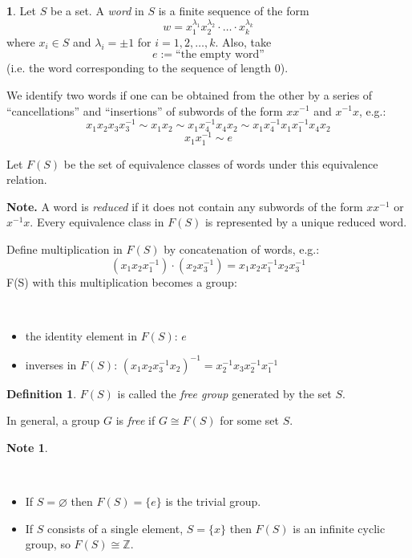 \documentclass[12pt, letterpaper, oneside]{article}
\theoremstyle{plain}
\theoremstyle{definition}
\newtheorem{definition}[theorem]{Definition}
\newtheorem{note}[theorem]{Note}
\newtheorem{nn}[theorem]{}
\newcommand{\Z}{{\mathbb Z}}
\newcommand{\bit}{\begin{itemize}}
\newcommand{\eit}{\end{itemize}}
\newcommand{\vs}{\vskip 5mm}
\begin{document}
\begin{nn}
Let $S$ be a set. A \emph{word} in $S$ is a finite sequence of the form
$$w = x_{1}^{\lambda_{1}}x_{2}^{\lambda_{2}}\cdot \dots\cdot x_{k}^{\lambda_{k}}$$
where $x_{i}\in S$ and $\lambda_{i}= \pm 1$ for $i=1, 2, \dots, k$. Also, take
$$e := \text{``the empty word''}$$
(i.e. the word corresponding to the sequence of length 0). 

\vs

We identify two words if one can be obtained from the other by a series of ``cancellations''
and ``insertions'' of subwords of the form $xx^{-1}$ and $x^{-1}x$, e.g.:
$$x_{1}x_{2}x_{3}x_{3}^{-1} \sim x_{1}x_{2} \sim x_{1}x_{4}^{-1}x_{4}x_{2}\sim 
x_{1}x_{4}^{-1}x_{1}x_{1}^{-1}x_{4}x_{2}$$
$$x_{1}x_{1}^{-1} \sim e$$

Let $F(S)$ be the set of equivalence classes of words under this equivalence relation.  

\vs 


\textbf{Note.}
A word is \emph{reduced}  if it does not contain any subwords of the form $xx^{-1}$
or $x^{-1}x$. Every equivalence class in $F(S)$ is represented by a unique reduced 
word. 


\vs

Define multiplication in $F(S)$ by concatenation of words, e.g.:
$$(x_{1}x_{2}x_{1}^{-1})\cdot (x_{2}x_{3}^{-1}) = x_{1}x_{2}x_{1}^{-1}x_{2}x_{3}^{-1}$$
F(S) with this multiplication becomes a group:

\vskip -13mm

\ 
\bit
\item  the identity element in $F(S)$: $e$  
\item inverses in $F(S)$:  $(x_{1}x_{2}x_{3}^{-1}x_{2})^{-1} = x_{2}^{-1}x_{3}x_{2}^{-1}x_{1}^{-1}$ 
\eit
\end{nn}

\vs 

\begin{definition}
$F(S)$ is called the \emph{free group} generated by the set $S$. 

In general, 
a group $G$ is \emph{free} if $G\cong F(S)$ for some set $S$. 
\end{definition}


\vs

\begin{note}\ 

\vskip -13mm 

\ 
\bit
\item If $S= \varnothing$ then $F(S) = \{e\}$ is the trivial group. 
\item If $S$ consists of a single element, $S= \{x\}$ then $F(S)$ is an infinite cyclic group, 
so $F(S)\cong \Z$.
\eit
\end{note}
\end{document}
